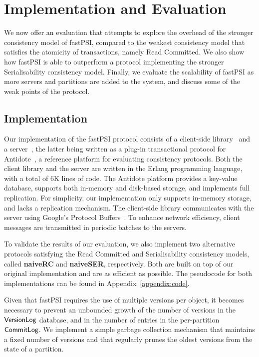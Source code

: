 \cleardoublepage
\chapter{Implementation and Evaluation}
\label{chapter:evaluation}

We now offer an evaluation that attempts to explore the overhead of the stronger consistency model of fastPSI, compared to the weakest consistency model that satisfies the atomicity of transactions, namely Read Committed. We also show how fastPSI is able to outperform a protocol implementing the stronger Serialisability consistency model. Finally, we evaluate the scalability of fastPSI as more servers and partitions are added to the system, and discuss some of the weak points of the protocol.

\section{Implementation}

Our implementation of the fastPSI protocol consists of a client-side library~\citep{pvc-client} and a server~\citep{pvc-server}, the latter being written as a plug-in transactional protocol for Antidote~\citep{antidote-db}, a reference platform for evaluating consistency protocols. Both the client library and the server are written in the Erlang programming language, with a total of 6K lines of code. The Antidote platform provides a key-value database, supports both in-memory and disk-based storage, and implements full replication. For simplicity, our implementation only supports in-memory storage, and lacks a replication mechanism. The client-side library communicates with the server using Google's Protocol Buffers~\citep{protobuf}. To enhance network efficiency, client messages are transmitted in periodic batches to the servers.

To validate the results of our evaluation, we also implement two alternative protocols satisfying the Read Committed and Serialisability consistency models, called \textbf{naiveRC} and \textbf{naiveSER}, respectively. Both are built on top of our original implementation and are as efficient as possible. The pseudocode for both implementations can be found in Appendix~\ref{appendix:code}.

Given that fastPSI requires the use of multiple versions per object, it becomes necessary to prevent an unbounded growth of the number of versions in the $\mathsf{VersionLog}$ database, and in the number of entries in the per-partition $\mathsf{CommitLog}$. We implement a simple garbage collection mechanism that maintains a fixed number of versions and that regularly prunes the oldest versions from the state of a partition.

